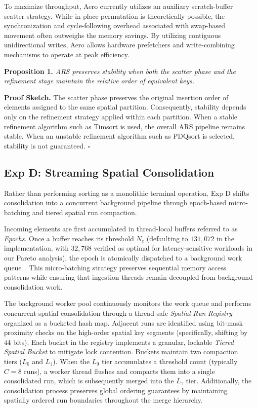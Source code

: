 To maximize throughput, Aero currently utilizes an auxiliary scratch-buffer scatter strategy.
While in-place permutation is theoretically possible, the synchronization and cycle-following overhead associated with swap-based movement often outweighs the memory savings.
By utilizing contiguous unidirectional writes, Aero allows hardware prefetchers and write-combining mechanisms to operate at peak efficiency.

\textbf{Proposition 1.}
\textit{ARS preserves stability when both the scatter phase and the refinement stage maintain the relative order of equivalent keys.}

\textbf{Proof Sketch.}
The scatter phase preserves the original insertion order of elements assigned to the same spatial partition. Consequently, stability depends only on the refinement strategy applied within each partition. When a stable refinement algorithm such as Timsort is used, the overall ARS pipeline remains stable. When an unstable refinement algorithm such as PDQsort is selected, stability is not guaranteed. \hfill $\square$

\subsection{Exp D: Streaming Spatial Consolidation}
Rather than performing sorting as a monolithic terminal operation, Exp D shifts consolidation into a concurrent background pipeline through epoch-based micro-batching and tiered spatial run compaction.

Incoming elements are first accumulated in thread-local buffers referred to as \textit{Epochs}.
Once a buffer reaches its threshold $N_e$ (defaulting to $131,072$ in the implementation, with $32,768$ verified as optimal for latency-sensitive workloads in our Pareto analysis), the epoch is atomically dispatched to a background work queue~\cite{zahariaDiscretizedStreamsFaulttolerant2013}.
This micro-batching strategy preserves sequential memory access patterns while ensuring that ingestion threads remain decoupled from background consolidation work.

The background worker pool continuously monitors the work queue and performs concurrent spatial consolidation through a thread-safe \textit{Spatial Run Registry} organized as a bucketed hash map.
Adjacent runs are identified using bit-mask proximity checks on the high-order spatial key segments (specifically, shifting by $44$ bits).
Each bucket in the registry implements a granular, lockable \textit{Tiered Spatial Bucket} to mitigate lock contention.
Buckets maintain two compaction tiers ($L_0$ and $L_1$).
When the $L_0$ tier accumulates a threshold count (typically $C = 8$ runs), a worker thread flushes and compacts them into a single consolidated run, which is subsequently merged into the $L_1$ tier.
Additionally, the consolidation process preserves global ordering guarantees by maintaining spatially ordered run boundaries throughout the merge hierarchy.

